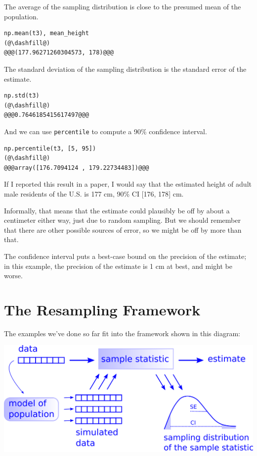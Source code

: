 The average of the sampling distribution is close to the presumed mean
of the population.

\begin{lstlisting}[]
np.mean(t3), mean_height
(@\dashfill@)
@@@(177.96271260304573, 178)@@@
\end{lstlisting}

The standard deviation of the sampling distribution is the standard
error of the estimate.

\begin{lstlisting}[]
np.std(t3)
(@\dashfill@)
@@@0.7646185415617497@@@
\end{lstlisting}

And we can use \passthrough{\lstinline!percentile!} to compute a 90\%
confidence interval.

\begin{lstlisting}[]
np.percentile(t3, [5, 95])
(@\dashfill@)
@@@array([176.7094124 , 179.22734483])@@@
\end{lstlisting}

If I reported this result in a paper, I would say that the estimated
height of adult male residents of the U.S. is 177 cm, 90\% CI {[}176,
178{]} cm.

Informally, that means that the estimate could plausibly be off by about
a centimeter either way, just due to random sampling. But we should
remember that there are other possible sources of error, so we might be
off by more than that.

The confidence interval puts a best-case bound on the precision of the
estimate; in this example, the precision of the estimate is 1 cm at
best, and might be worse.

\hypertarget{the-resampling-framework}{%
\section{The Resampling Framework}\label{the-resampling-framework}}

The examples we've done so far fit into the framework shown in this
diagram:

\includegraphics{chapters/figs/resampling.png}

